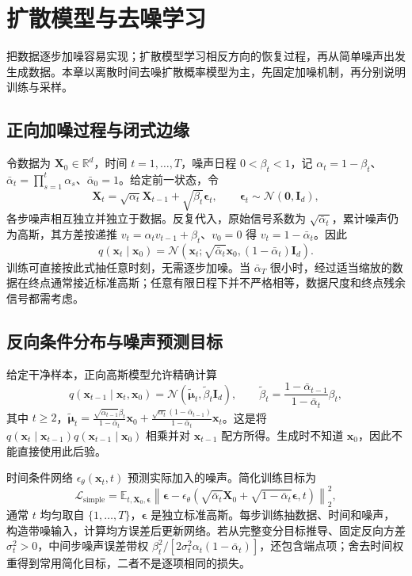 \documentclass[UTF8,12pt,a4paper,fontset=fandol]{ctexbook}
\begin{document}
\chapter{扩散模型与去噪学习}
\label{chap:dl-diffusion}
把数据逐步加噪容易实现；扩散模型学习相反方向的恢复过程，再从简单噪声出发生成数据。本章以离散时间去噪扩散概率模型为主\cite{ho2020}，先固定加噪机制，再分别说明训练与采样。

\section{正向加噪过程与闭式边缘}
令数据为 $\mathbf X_0\in\mathbb R^d$，时间 $t=1,\ldots,T$，噪声日程 $0<\beta_t<1$，记 $\alpha_t=1-\beta_t$、$\bar\alpha_t=\prod_{s=1}^t\alpha_s$、$\bar\alpha_0=1$。给定前一状态，令
\[
\mathbf X_t=\sqrt{\alpha_t}\mathbf X_{t-1}+\sqrt{\beta_t}\boldsymbol\epsilon_t,
\qquad \boldsymbol\epsilon_t\sim\mathcal N(\mathbf0,\mathbf I_d),
\]
各步噪声相互独立并独立于数据。反复代入，原始信号系数为 $\sqrt{\bar\alpha_t}$，累计噪声仍为高斯，其方差按递推 $v_t=\alpha_tv_{t-1}+\beta_t$、$v_0=0$ 得 $v_t=1-\bar\alpha_t$。因此
\begin{equation}
q(\mathbf x_t\mid\mathbf x_0)=\mathcal N(\mathbf x_t;\sqrt{\bar\alpha_t}\mathbf x_0,(1-\bar\alpha_t)\mathbf I_d).
\label{eq:dl-diffusion-forward}
\end{equation}
训练可直接按此式抽任意时刻，无需逐步加噪。当 $\bar\alpha_T$ 很小时，经过适当缩放的数据在终点通常接近标准高斯；任意有限日程下并不严格相等，数据尺度和终点残余信号都需考虑。

\section{反向条件分布与噪声预测目标}
给定干净样本，正向高斯模型允许精确计算
\[
q(\mathbf x_{t-1}\mid\mathbf x_t,\mathbf x_0)=\mathcal N(\widetilde{\boldsymbol\mu}_t,\widetilde\beta_t\mathbf I_d),\qquad
\widetilde\beta_t=\frac{1-\bar\alpha_{t-1}}{1-\bar\alpha_t}\beta_t,
\]
其中 $t\geq2$，$\widetilde{\boldsymbol\mu}_t=\frac{\sqrt{\bar\alpha_{t-1}}\beta_t}{1-\bar\alpha_t}\mathbf x_0+\frac{\sqrt{\alpha_t}(1-\bar\alpha_{t-1})}{1-\bar\alpha_t}\mathbf x_t$。这是将 $q(\mathbf x_t\mid\mathbf x_{t-1})q(\mathbf x_{t-1}\mid\mathbf x_0)$ 相乘并对 $\mathbf x_{t-1}$ 配方所得。生成时不知道 $\mathbf x_0$，因此不能直接使用此后验。

时间条件网络 $\epsilon_\theta(\mathbf x_t,t)$ 预测实际加入的噪声。简化训练目标为
\begin{equation}
\mathcal L_{\mathrm{simple}}=\mathbb E_{t,\mathbf X_0,\boldsymbol\epsilon}
\left\|\boldsymbol\epsilon-\epsilon_\theta(\sqrt{\bar\alpha_t}\mathbf X_0+\sqrt{1-\bar\alpha_t}\boldsymbol\epsilon,t)\right\|_2^2,
\label{eq:dl-diffusion-loss}
\end{equation}
通常 $t$ 均匀取自 $\{1,\ldots,T\}$，$\boldsymbol\epsilon$ 是独立标准高斯。每步训练抽数据、时间和噪声，构造带噪输入，计算均方误差后更新网络。若从完整变分目标推导、固定反向方差 $\sigma_t^2>0$，中间步噪声误差带权 $\beta_t^2/[2\sigma_t^2\alpha_t(1-\bar\alpha_t)]$，还包含端点项；舍去时间权重得到常用简化目标，二者不是逐项相同的损失。
\end{document}
